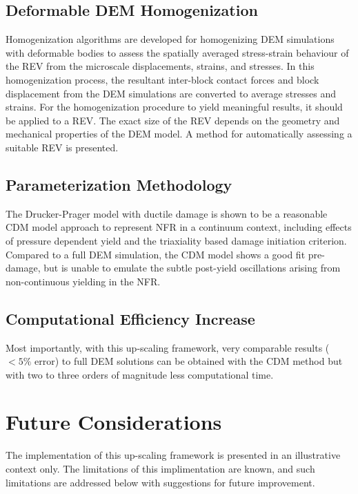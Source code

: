 \subsection*{Deformable DEM Homogenization}

Homogenization algorithms are developed for homogenizing DEM simulations with deformable bodies to assess the spatially averaged stress-strain behaviour of the REV from the microscale displacements, strains, and stresses. In this homogenization process, the resultant inter-block contact forces and block displacement from the DEM simulations are converted to average stresses and strains. For the homogenization procedure to yield meaningful results, it should be applied to a REV. The exact size of the REV depends on the geometry and mechanical properties of the DEM model. A method for automatically assessing a suitable REV is presented. 

\subsection*{Parameterization Methodology}

The Drucker-Prager model with ductile damage is shown to be a reasonable CDM model approach to represent NFR in a continuum context, including effects of pressure dependent yield and the triaxiality based damage initiation criterion. Compared to a full DEM simulation, the CDM model shows a good fit pre-damage, but is unable to emulate the subtle post-yield oscillations arising from non-continuous yielding in the NFR.

\subsection*{Computational Efficiency Increase}

Most importantly, with this up-scaling framework, very comparable results ($<5\%$ error) to full DEM solutions can be obtained with the CDM method but with two to three orders of magnitude less computational time.

\section{Future Considerations}

The implementation of this up-scaling framework is presented in an illustrative context only. The limitations of this implimentation are known, and such limitations are addressed below with suggestions for future improvement. 


